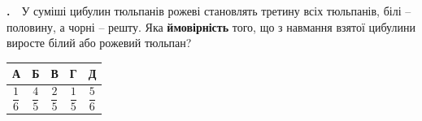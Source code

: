 \documentclass[12pt]{article}
\renewcommand{\headrulewidth}{0.4pt}
\renewcommand{\footrulewidth}{0.4pt}
\newlength{\nmtcellw}
\newcommand{\nmtSetCell}{\setlength{\nmtcellw}{\dimexpr(\linewidth-10\tabcolsep-6\arrayrulewidth)/5\relax}}
\newcommand{\answerTableTall}[5]{%
\par\nopagebreak\vspace{0.15cm}
\noindent\nmtSetCell
\begin{tabular}{|*{5}{>{\centering\arraybackslash}m{\nmtcellw}|}}
\hline
\rule[-0.2cm]{0pt}{0.7cm}\textbf{А} & \rule[-0.2cm]{0pt}{0.7cm}\textbf{Б} & \rule[-0.2cm]{0pt}{0.7cm}\textbf{В} & \rule[-0.2cm]{0pt}{0.7cm}\textbf{Г} & \rule[-0.2cm]{0pt}{0.7cm}\textbf{Д} \\
\hline
\rule[-0.45cm]{0pt}{1.2cm}#1 & \rule[-0.45cm]{0pt}{1.2cm}#2 & \rule[-0.45cm]{0pt}{1.2cm}#3 & \rule[-0.45cm]{0pt}{1.2cm}#4 & \rule[-0.45cm]{0pt}{1.2cm}#5 \\
\hline
\end{tabular}
\par\vspace{0.25cm}
}
\newcounter{zad}
\newcommand{\zadnum}{\stepcounter{zad}\textbf{\thezad.}\ \ }
\newcounter{ans}
\newcommand{\nbvspace}[1]{\nopagebreak\vspace{#1}}
\newcommand{\nmtnobreak}{\ifvmode\penalty10000 \fi}
\begin{document}
\begin{samepage}
\noindent\zadnum У суміші цибулин тюльпанів рожеві становлять третину всіх тюльпанів, білі – половину, а чорні – решту. Яка \textbf{ймовірність} того, що з навмання взятої цибулини виросте білий або рожевий тюльпан?

\nmtnobreak
\nopagebreak\nbvspace{0.3cm}
\answerTableTall{$\dfrac{1}{6}$}{$\dfrac{4}{5}$}{$\dfrac{2}{5}$}{$\dfrac{1}{5}$}{$\dfrac{5}{6}$}
\par{}
\end{samepage}
\endgroup

\begingroup
\providecommand{\matchingLayout}{}\renewcommand{\matchingLayout}[3]{
    \noindent
    \begin{minipage}[t]{0.36\textwidth}\vspace{0pt}\raggedright
       
        #1
    \end{minipage}%
    \hfill
    \begin{minipage}[t]{0.43\textwidth}\vspace{0pt}\raggedright
        
        #2
    \end{minipage}%
    \hfill
    \begin{minipage}[t]{0.19\textwidth}\vspace{0pt}\raggedright
        \vspace{0pt} %
        \begin{flushright}
        #3
        \end{flushright}
    \end{minipage}
}

\renewcommand{\headrulewidth}{0.4pt}
\renewcommand{\footrulewidth}{0.4pt}
\providecommand{\hexthree}{}\renewcommand{\hexthree}[2]{%
    \draw[hexcol, line width=1.1pt]
        ($(#1,#2)+(0:30)$) -- ($(#1,#2)+(60:30)$) -- ($(#1,#2)+(120:30)$) --
        ($(#1,#2)+(180:30)$) -- ($(#1,#2)+(240:30)$) -- ($(#1,#2)+(300:30)$) -- cycle;
}
\end{document}
